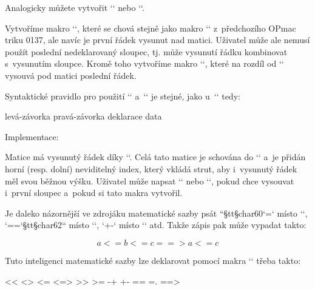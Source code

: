 Analogicky můžete vytvořit `\matrixL` nebo `\matrixLR`. 


 


Vytvoříme makro `\matrixA`, které se chová stejně jako makro `\matrixR` z~předchozího OPmac triku 0137, ale navíc je první řádek vysunut nad matici. Uživatel může ale nemusí použít poslední nedeklarovaný sloupec, tj. může vysunutí řádku kombinovat s~vysunutím sloupce. Kromě toho vytvoříme makro `\matrixB`, které na rozdíl od `\matrixA` vysouvá pod matici poslední řádek. 



Syntaktické pravidlo pro použití `\matrixA` a~`\matrixB` je stejné, jako u~`\matrixR` tedy: 

\begtt
\matrixA levá-závorka pravá-závorka {deklarace} {data} 
\endtt


Implementace: 

\begtt
\def\matrixA#1#2#3#4{%
   {\mathop{\matrixI#1#2{#3}{\noalign{\kern-\normalbaselineskip}#4}}%
    \limits^{\textstyle\mathstrut}}} 
\def\matrixB#1#2#3#4{%
   {\mathop{\matrixI#1#2{#3}{#4\crcr\noalign{\kern-\normalbaselineskip}}}%
    \limits_{\textstyle\mathstrut}}} 
\let\matrixI=\matrixR  %
\endtt


Matice má vysunutý řádek díky `\noalign{\kern-\normalbaselineskip}`. Celá tato matice je schována do `\mathop` a~je přidán horní (resp. dolní) neviditelný index, který vkládá strut, aby i~vysunutý řádek měl svou běžnou výšku. Uživatel může napsat `\let\matrixI=\matrixL` nebo `\let\matrixI=\matrixLR`, pokud chce vysouvat i~první sloupec a~pokud si tato makra vytvořil. 


 





Je daleko názornější ve zdrojáku matematické sazby psát ``{§tt§char60}`=` místo `\leq`, `==`{§tt§char62}`` místo `\Rightarrow`, `+-` místo `\pm` atd. Takže zápis pak může vypadat takto: 

\begtt
$$ a <= b <= c ==> a <= c $$ 
\endtt


Tuto inteligenci matematické sazby lze deklarovat pomocí makra `\msecdef` třeba takto: 

\begtt
\mspecdef <<   \ll 
\mspecdef <>   \neq 
\mspecdef <=   \leq 
\mspecdef <=>  \Leftrightarrow 
\mspecdef >>   \gg 
\mspecdef >=   \geq 
\mspecdef -+   \mp 
\mspecdef +-   \pm 
\mspecdef ==   \equiv 
\mspecdef =.   \doteq 
\mspecdef ==>  \Rightarrow 
\endtt


